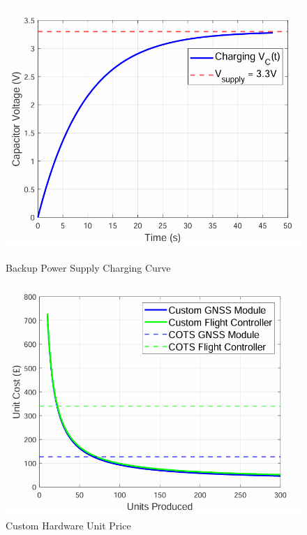 \begin{figure}[ht]
 \centering
 \begin{minipage}[t]{0.48\textwidth}
  \centering
  \includegraphics[width=\textwidth]{figs/Thomas/Custom Hardware/capacitor_discharge.png}
  \caption{Backup Power Supply Charging Curve}
  \label{fig:charging_curve}
 \end{minipage}
 \hfill
 \begin{minipage}[t]{0.48\textwidth}
  \centering
  \includegraphics[width=\textwidth]{figs/Thomas/Custom Hardware/price_curve.png}
  \caption{Custom Hardware Unit Price}
  \label{fig:price_curve}
 \end{minipage}
\end{figure}




